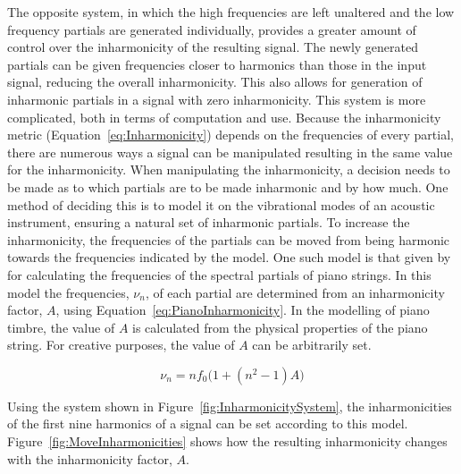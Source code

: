 		The opposite system, in which the high frequencies are left unaltered and the low frequency partials are
		generated individually, provides a greater amount of control over the inharmonicity of the resulting
		signal. The newly generated partials can be given frequencies closer to harmonics than those in the input
		signal, reducing the overall inharmonicity. This also allows for generation of inharmonic partials in a
		signal with zero inharmonicity. This system is more complicated, both in terms of computation and use.
		Because the inharmonicity metric (Equation~\ref{eq:Inharmonicity}) depends on the frequencies of every
		partial, there are numerous ways a signal can be manipulated resulting in the same value for the
		inharmonicity. When manipulating the inharmonicity, a decision needs to be made as to which partials are to
		be made inharmonic and by how much. One method of deciding this is to model it on the vibrational modes of
		an acoustic instrument, ensuring a natural set of inharmonic partials. To increase the inharmonicity, the
		frequencies of the partials can be moved from being harmonic towards the frequencies indicated by the
		model. One such model is that given by \citet{rossing2002the} for calculating the frequencies of the
		spectral partials of piano strings. In this model the frequencies, $\nu_{n}$, of each partial are
		determined from an inharmonicity factor, $A$, using Equation~\ref{eq:PianoInharmonicity}. In the modelling
		of piano timbre, the value of $A$ is calculated from the physical properties of the piano string. For
		creative purposes, the value of $A$ can be arbitrarily set.

		\begin{equation}
			\nu_{n} = nf_{0} \bigl( 1 + \left( n^{2} - 1 \right) A \bigr)
			\label{eq:PianoInharmonicity}
		\end{equation}

		Using the system shown in Figure~\ref{fig:InharmonicitySystem}, the inharmonicities of the first nine
		harmonics of a signal can be set according to this model. Figure~\ref{fig:MoveInharmonicities} shows how
		the resulting inharmonicity changes with the inharmonicity factor, $A$.

